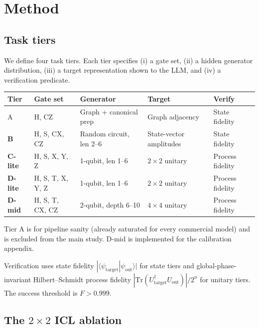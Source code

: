 \documentclass[11pt]{article}
\begin{document}
\section{Method}

\subsection{Task tiers}

We define four task tiers. Each tier specifies (i) a gate set, (ii) a hidden generator distribution, (iii) a target representation shown to the LLM, and (iv) a verification predicate.

\begin{center}
\small
\begin{tabular}{lllll}
\toprule
\textbf{Tier} & \textbf{Gate set} & \textbf{Generator} & \textbf{Target} & \textbf{Verify} \\
\midrule
A & H, CZ & Graph + canonical prep & Graph adjacency & State fidelity \\
\textbf{B} & H, S, CX, CZ & Random circuit, len 2--6 & State-vector amplitudes & State fidelity \\
\textbf{C-lite} & H, S, X, Y, Z & 1-qubit, len 1--6 & $2\times2$ unitary & Process fidelity \\
\textbf{D-lite} & H, S, T, X, Y, Z & 1-qubit, len 1--6 & $2\times2$ unitary & Process fidelity \\
\textbf{D-mid} & H, S, T, CX, CZ & 2-qubit, depth 6--10 & $4\times4$ unitary & Process fidelity \\
\bottomrule
\end{tabular}
\end{center}

Tier A is for pipeline sanity (already saturated for every commercial model) and is excluded from the main study. D-mid is implemented for the calibration appendix.

Verification uses state fidelity $|\langle\psi_{\text{target}}|\psi_{\text{out}}\rangle|$ for state tiers and global-phase-invariant Hilbert--Schmidt process fidelity $|\mathrm{Tr}(U_{\text{target}}^\dagger U_{\text{out}})|/2^n$ for unitary tiers. The success threshold is $F > 0.999$.

\subsection{The $2\times2$ ICL ablation}
\end{document}
